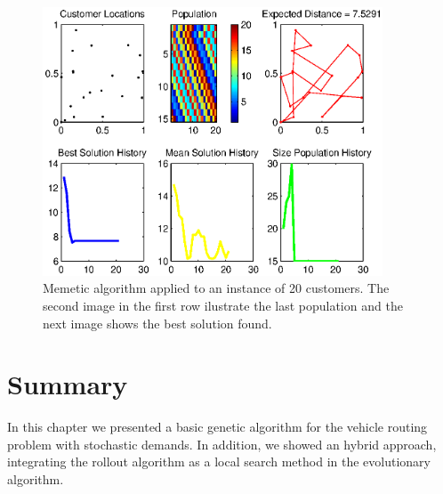 \begin{figure}[!htbp]
  \begin{center}
   \includegraphics[width=0.9\textwidth]{Images/Chapter3/mvi_20r4_m_memetic.eps}
  \end{center}
    \caption{Memetic algorithm applied to an instance of 20 customers. The second image in the first row ilustrate the last population and the next image shows the best solution found.}\label{fig:memetic_mvi_20r4_m}
\end{figure}

\section{Summary}

In this chapter we presented a basic genetic algorithm for the vehicle routing problem with stochastic demands. In addition, we showed an hybrid approach, integrating the rollout algorithm as  a local search method in the evolutionary algorithm.